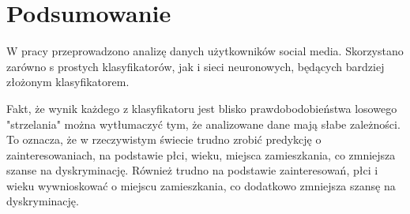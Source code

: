 \documentclass[12pt,a4paper]{article}
\begin{document}
\newpage

\section{Podsumowanie}

W pracy przeprowadzono analizę danych użytkowników social media. Skorzystano zarówno s prostych klasyfikatorów, jak i sieci neuronowych, będących bardziej złożonym klasyfikatorem.

Fakt, że wynik każdego z klasyfikatoru jest blisko prawdobodobieństwa losowego "strzelania" można wytłumaczyć tym, że analizowane dane mają słabe zależności. To oznacza, że w rzeczywistym świecie trudno zrobić predykcję o zainteresowaniach, na podstawie płci, wieku, miejsca zamieszkania, co zmniejsza szanse na dyskryminację. Również trudno na podstawie zainteresowań, płci i wieku wywnioskować o miejscu zamieszkania, co dodatkowo zmniejsza szansę na dyskryminację.
\end{document}
